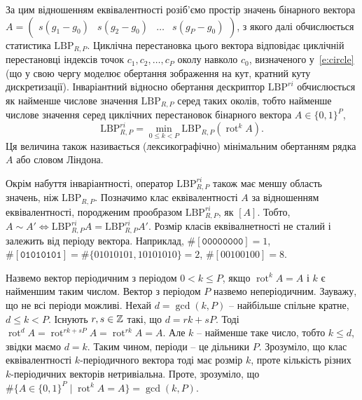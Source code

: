 За цим відношенням еквівалентності розіб'ємо простір значень бінарного вектора $A = \begin{pmatrix}
    s(g_1 - g_0) & s(g_2 - g_0) & \dots  & s(g_P - g_0)
\end{pmatrix}$, з якого далі обчислюється статистика $\mathrm{LBP}_{R,P}$. 
Циклічна перестановка цього вектора відповідає циклічній перестановці індексів точок $c_1, c_2, \dots , c_P$ околу навколо $c_0$, визначеного у~\eqref{e:circle} 
(що у свою чергу моделює обертання зображення на кут, кратний куту дискретизації).
Інваріантний відносно обертання дескриптор $\mathrm{LBP}^{ri}$ обчислюється як найменше числове значення $\mathrm{LBP}_{R,P}$ серед таких околів,
тобто найменше числове значення серед циклічних перестановок бінарного вектора $A \in \{0,1\}^P$,
\begin{equation*}
    \mathrm{LBP}^{ri}_{R,P} = \min_{0\le k < P} \mathrm{LBP}_{R,P} \left( \operatorname{rot}^k A \right).
\end{equation*}
Ця величина також називається (лексикографічно) мінімальним обертанням рядка $A$ або словом Ліндона.   

Окрім набуття інваріантності, оператор $\mathrm{LBP}^{ri}_{R,P}$ також має меншу область значень, ніж $\mathrm{LBP}_{R,P}$.
Позначимо клас еквівалентності $A$ за відношенням еквівалентності, породженим прообразом $\mathrm{LBP}^{ri}_{R,P}$, як $[A]$.
Тобто, $A \sim A' \iff \mathrm{LBP}^{ri}_{R,P} A = \mathrm{LBP}^{ri}_{R,P} A'$.
Розмір класів еквівалнетності не сталий і залежить від періоду вектора. 
Наприклад, $\# [\texttt{00000000}] = 1$, $\# [\texttt{01010101}] = \# \{01010101,10101010\} = 2$, $\# [00100100] = 8$.

Назвемо вектор періодичним з періодом $0<k\le P$, якщо $\operatorname{rot}^k A = A$ і $k$ є найменшим таким числом.
Вектор з періодом $P$ назвемо неперіодичним.
Зауважу, що не всі періоди можливі. Нехай $d=\operatorname{gcd}(k,P)$ -- найбільше спільне кратне, $d\le k < P$. 
Існують $r,s\in \mathbb Z$ такі, що $d=rk+sP$. Тоді $\operatorname{rot}^d A = \operatorname{rot}^{rk+sP} A = \operatorname{rot}^{rk} A = A$.
Але $k$ -- найменше таке число, тобто $k \le d$, звідки маємо $d=k$. Таким чином, періоди -- це дільники $P$.
Зрозуміло, що клас еквівалентності $k$-періодичного вектора тоді має розмір $k$, проте кількість різних $k$-періодичних векторів нетривіальна.
Проте, зрозуміло, що $\# \{A\in \{0,1\}^P \mid \operatorname{rot}^k A = A\} = \operatorname{gcd}(k,P)$.  

